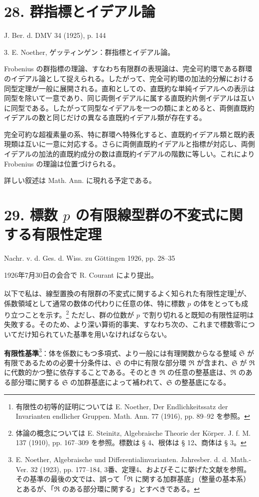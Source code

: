 \documentclass[11pt]{article}
\begin{document}
\section*{28. 群指標とイデアル論}

\begin{center}
J. Ber. d. DMV 34 (1925), p. 144
\end{center}

3. E. Noether, ゲッティンゲン：群指標とイデアル論。

Frobenius の群指標の理論、すなわち有限群の表現論は、完全可約環である群環のイデアル論として捉えられる。したがって、完全可約環の加法的分解における同型定理が一般に展開される。直和としての、直既約な単純イデアルへの表示は同型を除いて一意であり、同じ両側イデアルに属する直既約片側イデアルは互いに同型である。したがって同型なイデアルを一つの類にまとめると、両側直既約イデアルの数と同じだけの異なる直既約イデアル類が存在する。

完全可約な超複素量の系、特に群環へ特殊化すると、直既約イデアル類と既約表現類は互いに一意に対応する。さらに両側直既約イデアルと指標が対応し、両側イデアルの加法的直既約成分の数は直既約イデアルの階数に等しい。これにより Frobenius の理論は位置づけられる。

詳しい叙述は Math. Ann. に現れる予定である。

\section*{29. 標数 $p$ の有限線型群の不変式に関する有限性定理}

\begin{center}
Nachr. v. d. Ges. d. Wiss. zu Göttingen 1926, pp. 28--35
\end{center}

1926年7月30日の会合で R. Courant により提出。

以下で私は、線型置換の有限群の不変式に関するよく知られた有限性定理\footnote{有限性の初等的証明については E. Noether, Der Endlichkeitssatz der Invarianten endlicher Gruppen. Math. Ann. 77 (1916), pp. 89--92 を参照。}が、係数領域として通常の数体の代わりに任意の体、特に標数 $p$ の体をとっても成り立つことを示す。\footnote{体論の概念については E. Steinitz, Algebraische Theorie der Körper. J. f. M. 137 (1910), pp. 167--309 を参照。標数は § 4、根体は § 12、商体は § 3。} ただし、群の位数が $p$ で割り切れると既知の有限性証明は失敗する。そのため、より深い算術的事実、すなわち次の、これまで標数零についてだけ知られていた基準を用いなければならない。

\textbf{有限性基準}\footnote{E. Noether, Algebraische und Differentialinvarianten. Jahresber. d. d. Math.-Ver. 32 (1923), pp. 177--184, 3番、定理4、およびそこに挙げた文献を参照。その基準の最後の文では、誤って「$\mathfrak R$ に関する加群基底」（整量の基本系）とあるが、「$\mathfrak R$ のある部分環に関する」とすべきである。}：体を係数にもつ多項式、より一般には有理関数からなる整域 $\mathfrak S$ が有限であるための必要十分条件は、$\mathfrak S$ の中に有限な部分環 $\mathfrak R$ が含まれ、$\mathfrak S$ が $\mathfrak R$ に代数的かつ整に依存することである。そのとき $\mathfrak R$ の任意の整基底は、$\mathfrak R$ のある部分環に関する $\mathfrak S$ の加群基底によって補われて、$\mathfrak S$ の整基底になる。
\end{document}
